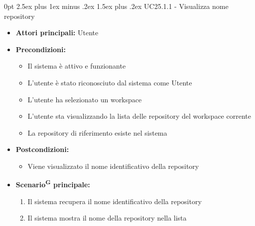 \documentclass[a4paper, 11pt]{article}
\makeatletter
\renewcommand\paragraph{\@startsection{paragraph}{4}
  {0pt}
  {2.5ex plus 1ex minus .2ex}
  {1.5ex plus .2ex}
  {\normalfont\normalsize\bfseries\color{AccentDark}}}
\makeatother
\begin{document}
\paragraph{UC25.1.1 - Visualizza nome repository}\label{UC25.1.1}
\begin{itemize}
	\item \textbf{Attori principali:} Utente
	\item \textbf{Precondizioni:} 
	\begin{itemize}
		\item Il sistema è attivo e funzionante
		\item L'utente è stato riconosciuto dal sistema come Utente
		\item L'utente ha selezionato un workspace 
		\item L'utente sta visualizzando la lista delle repository del workspace corrente
		\item La repository di riferimento esiste nel sistema
	\end{itemize}
	\item \textbf{Postcondizioni:} 
	\begin{itemize}
		\item Viene visualizzato il nome identificativo della repository
	\end{itemize}
	\item \textbf{Scenario\textsuperscript{G} principale:}
	\begin{enumerate}
		\item Il sistema recupera il nome identificativo della repository
		\item Il sistema mostra il nome della repository nella lista
	\end{enumerate}
\end{itemize}
\end{document}
